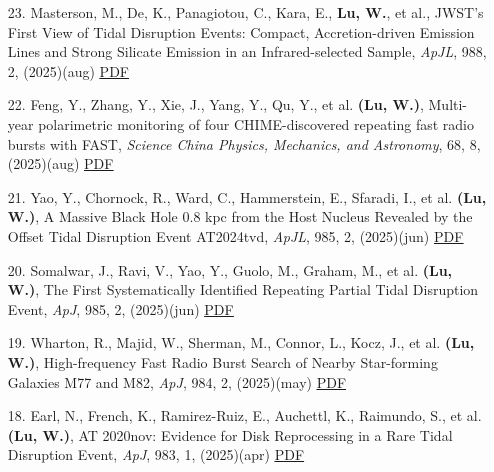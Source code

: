 \begin{itemize}[leftmargin=0.65cm]
\vspace{-0.1cm}
\item[23.]{Masterson, M., De, K., Panagiotou, C., Kara, E., {\bf Lu, W.}, et al., {JWST's First View of Tidal Disruption Events: Compact, Accretion-driven Emission Lines and Strong Silicate Emission in an Infrared-selected Sample}, {\it ApJL}, 988, 2, (2025)(aug) \href{https://ui.adsabs.harvard.edu/abs/2025ApJ...988L..48M}{\underline{PDF}}}

\vspace{-0.1cm}
\item[22.]{Feng, Y., Zhang, Y., Xie, J., Yang, Y., Qu, Y., et al. {\bf (Lu, W.)}, {Multi-year polarimetric monitoring of four CHIME-discovered repeating fast radio bursts with FAST}, {\it Science China Physics, Mechanics, and Astronomy}, 68, 8, (2025)(aug) \href{https://ui.adsabs.harvard.edu/abs/2025SCPMA..6889511F}{\underline{PDF}}}

\vspace{-0.1cm}
\item[21.]{Yao, Y., Chornock, R., Ward, C., Hammerstein, E., Sfaradi, I., et al. {\bf (Lu, W.)}, {A Massive Black Hole 0.8 kpc from the Host Nucleus Revealed by the Offset Tidal Disruption Event AT2024tvd}, {\it ApJL}, 985, 2, (2025)(jun) \href{https://ui.adsabs.harvard.edu/abs/2025ApJ...985L..48Y}{\underline{PDF}}}

\vspace{-0.1cm}
\item[20.]{Somalwar, J., Ravi, V., Yao, Y., Guolo, M., Graham, M., et al. {\bf (Lu, W.)}, {The First Systematically Identified Repeating Partial Tidal Disruption Event}, {\it ApJ}, 985, 2, (2025)(jun) \href{https://ui.adsabs.harvard.edu/abs/2025ApJ...985..175S}{\underline{PDF}}}

\vspace{-0.1cm}
\item[19.]{Wharton, R., Majid, W., Sherman, M., Connor, L., Kocz, J., et al. {\bf (Lu, W.)}, {High-frequency Fast Radio Burst Search of Nearby Star-forming Galaxies M77 and M82}, {\it ApJ}, 984, 2, (2025)(may) \href{https://ui.adsabs.harvard.edu/abs/2025ApJ...984..119W}{\underline{PDF}}}

\vspace{-0.1cm}
\item[18.]{Earl, N., French, K., Ramirez-Ruiz, E., Auchettl, K., Raimundo, S., et al. {\bf (Lu, W.)}, {AT 2020nov: Evidence for Disk Reprocessing in a Rare Tidal Disruption Event}, {\it ApJ}, 983, 1, (2025)(apr) \href{https://ui.adsabs.harvard.edu/abs/2025ApJ...983...28E}{\underline{PDF}}}


\end{itemize}
